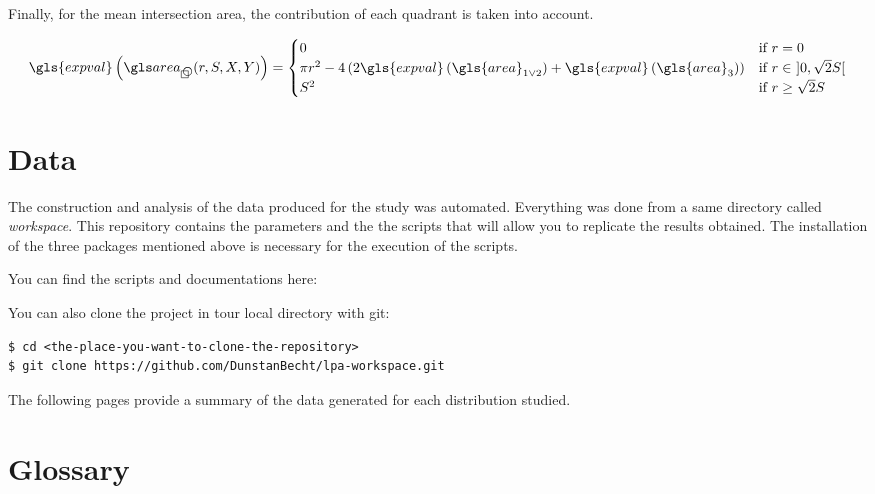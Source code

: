 \begin{appendix}
\medskip

Finally, for the mean intersection area, the contribution of each quadrant is taken into account.

\begin{equation}\label{eq:mean-circle-square-intersection}
\gls{expval} \left( \cirsqr (r, S, X, Y) \right) =
\begin{cases}
0 &\text{if } r = 0 \\
\pi r^2 - 4 \left(2 \gls{expval} \left( \gls{area}_{1 \lor 2} \right) +\gls{expval} \left( \gls{area}_{3} \right)\right) &\text{if } r \in \ ] 0, \sqrt{2} S [ \\
S^2 &\text{if } r \geq \sqrt{2} S
\end{cases}
\end{equation}


\section{Data}\label{sec:data}

The construction and analysis of the data produced for the study was automated.
Everything was done from a same directory called \textit{workspace}.
This repository contains the parameters and the the scripts that will allow you to replicate the results obtained.
The installation of the three packages mentioned above is necessary for the execution of the scripts.

\bigskip

You can find the scripts and documentations here: 

\bigskip

You can also clone the project in tour local directory with git:

\begin{tcolorbox}[width=\linewidth, title=shell]
\begin{verbatim}
$ cd <the-place-you-want-to-clone-the-repository>
$ git clone https://github.com/DunstanBecht/lpa-workspace.git
\end{verbatim}
\end{tcolorbox}

\bigskip

The following pages provide a summary of the data generated for each distribution studied.

\newpage

\begin{multicols}{2}



\newpage

\end{multicols}

\newpage

\section{Glossary}

\printnoidxglossaries

\printbibliography[heading=bibintoc, heading=bibnumbered]

\end{appendix}
